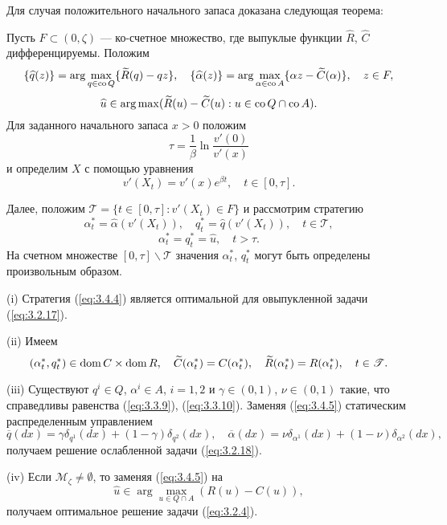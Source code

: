Для случая положительного начального запаса доказана следующая теорема:
\begin{theorem} \label{th:3.6}
Пусть $F\subset (0,\zeta)$ --- ко-счетное множество, где выпуклые функции $\widehat R$, $\widehat C$ дифференцируемы. Положим
$$ \{\widehat q(z)\}=\arg\max_{q\in {\rm co\,} Q} \{\widetilde R(q)-q z\},\quad
\{\widehat\alpha(z)\}=\arg\max_{\alpha\in{\rm co\,} A}\{\alpha z-\widetilde C(\alpha)\},\quad z\in F,$$
$$\widehat u\in\arg\max(\widetilde R(u)-\widetilde C(u):u\in{\rm co\,} Q\cap{\rm co\,} A).$$
Для заданного начального запаса $x>0$ положим
$$\tau=\frac{1}{\beta}\ln\frac{v'(0)}{v'(x)}$$
и определим $X$ с помощью уравнения
\begin{equation} \label{eq:3.4.3}
v'(X_t)=v'(x)e^{\beta t},\quad t\in [0,\tau].
\end{equation}

Далее, положим $\mathscr T=\{t\in [0,\tau]:v'(X_t)\in F\}$ и рассмотрим стратегию
\begin{equation} \label{eq:3.4.4}
\alpha^*_t=\widehat\alpha(v'(X_t)),\quad q^*_t=\widehat q(v'(X_t)),\quad t\in\mathscr T,
\end{equation}
\begin{equation} \label{eq:3.4.5}
\alpha^*_t=q^*_t=\widehat u,\quad t>\tau.
\end{equation}
На счетном множестве $[0,\tau]\backslash \mathscr T$ значения $\alpha^*_t$, $q_t^*$ могут быть определены произвольным образом.

(i) Стратегия (\ref{eq:3.4.4}) является оптимальной для овыпукленной задачи (\ref{eq:3.2.17}).

(ii) Имеем
\begin{equation} \label{eq:3.4.6}
(\alpha_t^*,q_t^*)\in{\rm dom\,} C\times{\rm dom\,} R,\quad \widetilde C(\alpha^*_t)=C(\alpha^*_t),\quad \widetilde R(\alpha_t^*)=R(\alpha_t^*),\quad t\in\mathscr T.
\end{equation}

(iii) Существуют $q^i\in Q$, $\alpha^i\in A$, $i=1,2$ и $\gamma\in (0,1)$, $\nu\in (0,1)$ такие, что справедливы равенства (\ref{eq:3.3.9}), (\ref{eq:3.3.10}). Заменяя (\ref{eq:3.4.5}) статическим распределенным управлением
\begin{equation} \label{eq:3.4.7}
\overline q(dx)=\gamma\delta_{q^1}(dx)+(1-\gamma)\delta_{q^2}(dx),\quad
\overline \alpha(dx)=\nu\delta_{\alpha^1}(dx)+(1-\nu)\delta_{\alpha^2}(dx),
\end{equation}
получаем решение ослабленной задачи (\ref{eq:3.2.18}).

(iv) Если $\mathscr M_\zeta\neq\emptyset$, то заменяя (\ref{eq:3.4.5}) на
\begin{equation} \label{eq:3.4.8}
\widehat u\in\arg\max_{u\in Q\cap A}(R(u)-C(u)),
\end{equation}
получаем оптимальное решение задачи (\ref{eq:3.2.4}).
\end{theorem}

